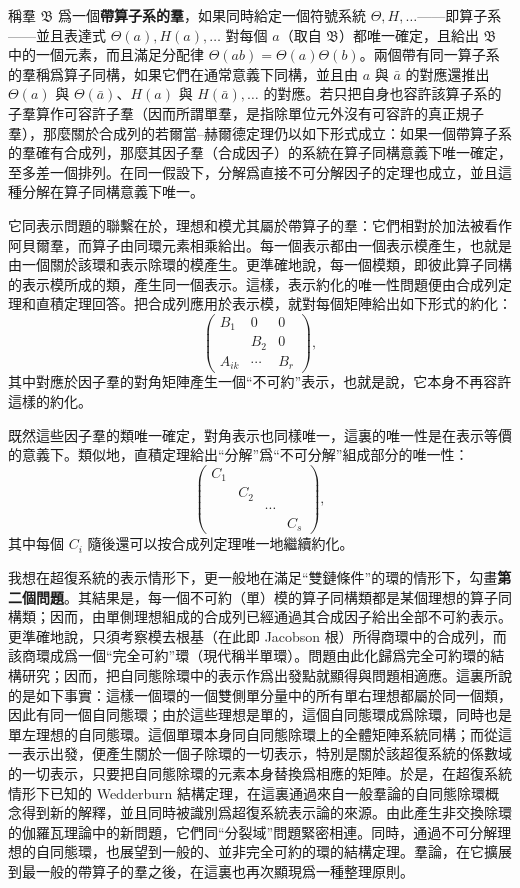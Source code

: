 \documentclass[11pt]{article}
\newcommand{\srcemph}[1]{\textbf{#1}}
\begin{document}
稱羣 $\mathfrak{B}$ 爲一個\srcemph{帶算子系的羣}，如果同時給定一個符號系統 $\Theta,H,\ldots$——即算子系——並且表達式 $\Theta(a),H(a),\ldots$ 對每個 $a$（取自 $\mathfrak{B}$）都唯一確定，且給出 $\mathfrak{B}$ 中的一個元素，而且滿足分配律 $\Theta(ab)=\Theta(a)\Theta(b)$。兩個帶有同一算子系的羣稱爲算子同構，如果它們在通常意義下同構，並且由 $a$ 與 $\bar a$ 的對應還推出 $\Theta(a)$ 與 $\Theta(\bar a)$、$H(a)$ 與 $H(\bar a),\ldots$ 的對應。若只把自身也容許該算子系的子羣算作可容許子羣（因而所謂單羣，是指除單位元外沒有可容許的真正規子羣），那麼關於合成列的若爾當--赫爾德定理仍以如下形式成立：如果一個帶算子系的羣確有合成列，那麼其因子羣（合成因子）的系統在算子同構意義下唯一確定，至多差一個排列。在同一假設下，分解爲直接不可分解因子的定理也成立，並且這種分解在算子同構意義下唯一。

它同表示問題的聯繫在於，理想和模尤其屬於帶算子的羣：它們相對於加法被看作阿貝爾羣，而算子由同環元素相乘給出。每一個表示都由一個表示模產生，也就是由一個關於該環和表示除環的模產生。更準確地說，每一個模類，即彼此算子同構的表示模所成的類，產生同一個表示。這樣，表示約化的唯一性問題便由合成列定理和直積定理回答。把合成列應用於表示模，就對每個矩陣給出如下形式的約化：
\[
\begin{pmatrix}
B_1&0&0\\
&B_2&0\\
A_{ik}&\cdots&B_r
\end{pmatrix},
\]
其中對應於因子羣的對角矩陣產生一個“不可約”表示，也就是說，它本身不再容許這樣的約化。

既然這些因子羣的類唯一確定，對角表示也同樣唯一，這裏的唯一性是在表示等價的意義下。類似地，直積定理給出“分解”爲“不可分解”組成部分的唯一性：
\[
\begin{pmatrix}
C_1&&&\\
&C_2&&\\
&&\cdots&\\
&&&C_s
\end{pmatrix},
\]
其中每個 $C_i$ 隨後還可以按合成列定理唯一地繼續約化。

我想在超復系統的表示情形下，更一般地在滿足“雙鏈條件”的環的情形下，勾畫\srcemph{第二個問題}。其結果是，每一個不可約（單）模的算子同構類都是某個理想的算子同構類；因而，由單側理想組成的合成列已經通過其合成因子給出全部不可約表示。更準確地說，只須考察模去根基（在此即 Jacobson 根）所得商環中的合成列，而該商環成爲一個“完全可約”環（現代稱半單環）。問題由此化歸爲完全可約環的結構研究；因而，把自同態除環中的表示作爲出發點就顯得與問題相適應。這裏所說的是如下事實：這樣一個環的一個雙側單分量中的所有單右理想都屬於同一個類，因此有同一個自同態環；由於這些理想是單的，這個自同態環成爲除環，同時也是單左理想的自同態環。這個單環本身同自同態除環上的全體矩陣系統同構；而從這一表示出發，便產生關於一個子除環的一切表示，特別是關於該超復系統的係數域的一切表示，只要把自同態除環的元素本身替換爲相應的矩陣。於是，在超復系統情形下已知的 Wedderburn 結構定理，在這裏通過來自一般羣論的自同態除環概念得到新的解釋，並且同時被識別爲超復系統表示論的來源。由此產生非交換除環的伽羅瓦理論中的新問題，它們同“分裂域”問題緊密相連。同時，通過不可分解理想的自同態環，也展望到一般的、並非完全可約的環的結構定理。羣論，在它擴展到最一般的帶算子的羣之後，在這裏也再次顯現爲一種整理原則。

\endgroup
\end{document}
